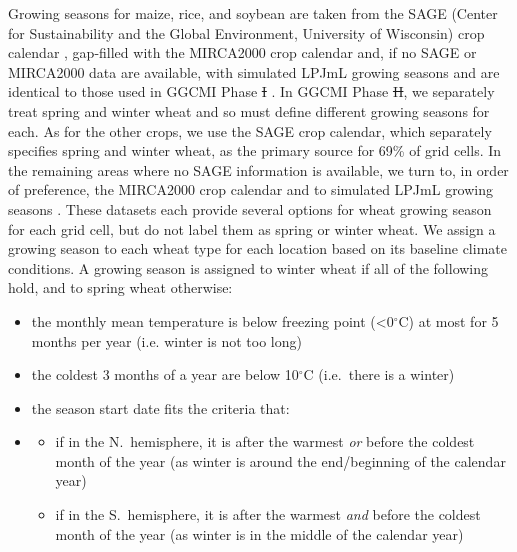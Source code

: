 \documentclass[gmd, manuscript]{copernicus} %
\providecommand{\DIFadd}[1]{{\protect\color{blue}\uwave{#1}}} %
\providecommand{\DIFdel}[1]{{\protect\color{red}\sout{#1}}}                      %
\providecommand{\DIFaddbegin}{} %
\providecommand{\DIFaddend}{} %
\providecommand{\DIFdelbegin}{} %
\providecommand{\DIFdelend}{} %
\begin{document}
Growing seasons for maize, rice, and soybean are taken from the SAGE (Center for Sustainability and the Global Environment, University of Wisconsin) crop calendar \citep{Sacks2010}, gap-filled with the MIRCA2000 crop calendar \citep{Portmann2010} and, if no SAGE or MIRCA2000 data are available, with simulated LPJmL growing seasons \citep{waha2012climate} and are identical to those used in GGCMI Phase \DIFdelbegin \DIFdel{I }\DIFdelend \DIFaddbegin \DIFadd{1 }\DIFaddend \citep{Elliott2015}.
In GGCMI Phase \DIFdelbegin \DIFdel{II}\DIFdelend \DIFaddbegin \DIFadd{2}\DIFaddend , we separately treat spring and winter wheat and so must define different growing seasons for each.
As for the other crops, we use the SAGE crop calendar, which separately specifies spring and winter wheat, as the primary source for 69\% of grid cells. 
In the remaining areas where no SAGE information is available, we turn to, in order of preference, the MIRCA2000 crop calendar \citep{Portmann2010} and to simulated LPJmL growing seasons \citep{waha2012climate}.  
These datasets each provide several options for wheat growing season for each grid cell, but do not label them as spring or winter wheat. 
We assign a growing season to each wheat type for each location based on its baseline climate conditions. 
A growing season is assigned to winter wheat if all of the following hold, and to spring wheat otherwise:

\begin{itemize}
  \item{the monthly mean temperature is below freezing point (<0$^\circ$C) at most for 5 months per year (i.e. winter is not too long)}
  \item{the coldest 3 months of a year are below 10$^\circ$C (i.e.\ there is a winter)}
  \item{the season start date fits the criteria that:}
  \DIFdelbegin %
\DIFdelend \DIFaddbegin \item[]{
    \begin{itemize}  
      \item{if in the N.\ hemisphere, it is after the warmest \textit{or} before the coldest month of the year (as winter is around the end/beginning of the calendar year)}
      \item{if in the S.\ hemisphere, it is after the warmest \textit{and} before the coldest month of the year (as winter is in the middle of the calendar year)}
      \end{itemize}
      }
\DIFaddend \end{itemize}
\end{document}
